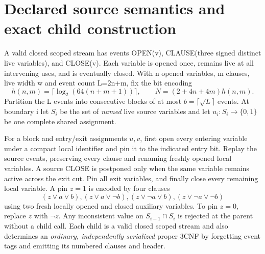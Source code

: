 \documentclass[11pt]{article}
\begin{document}
\section{Declared source semantics and exact child construction}
A valid closed scoped stream has events OPEN(v), CLAUSE(three signed distinct live variables), and CLOSE(v). Each variable is opened once, remains live at all intervening uses, and is eventually closed. With n opened variables, m clauses, live width w and event count L=2n+m, fix the bit encoding
\[
 h(n,m)=\lceil\log_2(64(n+m+1))\rceil,\qquad
 N=(2+4n+4m)h(n,m).
\]
Partition the L events into consecutive blocks of at most \(b=\lceil\sqrt L\rceil\) events. At boundary i let \(S_i\) be the set of \emph{named} live source variables and let \(u_i:S_i\to\{0,1\}\) be one complete shared assignment.

For a block and entry/exit assignments \(u,v\), first open every entering variable under a compact local identifier and pin it to the indicated entry bit. Replay the source events, preserving every clause and renaming freshly opened local variables. A source CLOSE is postponed only when the same variable remains active across the exit cut. Pin all exit variables, and finally close every remaining local variable. A pin \(z=1\) is encoded by four clauses
\[
(z\vee a\vee b),(z\vee a\vee\neg b),
(z\vee\neg a\vee b),(z\vee\neg a\vee\neg b)
\]
using two fresh locally opened and closed auxiliary variables. To pin \(z=0\), replace \(z\) with \(\neg z\). Any inconsistent value on \(S_{i-1}\cap S_i\) is rejected at the parent without a child call. Each child is a valid closed scoped stream and also determines an \emph{ordinary, independently serialized} proper 3CNF by forgetting event tags and emitting its numbered clauses and header.
\end{document}
